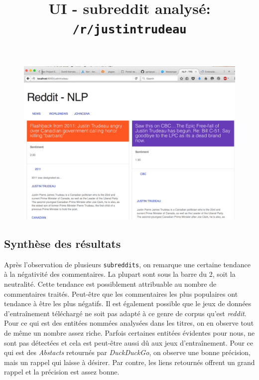 \documentclass[12pt]{article}
\begin{document}
\begin{figure}
  \begin{center}
    \title{UI - subreddit analysé: \verb;/r/justintrudeau;}
  \end{center}
  \includegraphics[width=18cm]{fig/ui-example.png}
  \label{fig:ui-example}
\end{figure}

\subsection{Synthèse des résultats}

Après l'observation de plusieurs \verb;subreddits;, on remarque une certaine tendance à la négativité des commentaires. La plupart sont sous la barre du 2, soit la neutralité. Cette tendance est possiblement attribuable au nombre de commentaires traités. Peut-être que les commentaires les plus populaires ont tendance à être les plus négatifs. Il est également possible que le jeux de données d'entraînement téléchargé ne soit pas adapté à ce genre de corpus qu'est \textit{reddit}. Pour ce qui est des entitées nommées analysées dans les titres, on en observe tout de même un nombre assez riche. Parfois certaines entitées évidentes pour nous, ne sont pas détectées et cela est peut-être aussi dû aux jeux d'entraînement. Pour ce qui est des \textit{Abstacts} retournés par \textit{DuckDuckGo}, on observe une bonne précision, mais un rappel qui laisse à désirer. Par contre, les liens retournés offrent un grand rappel et la précision est assez bonne.

\end{document}
